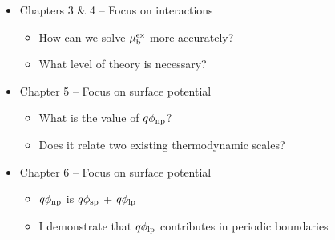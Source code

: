 \begin{intro}
   \begin{itemize}
       \item Chapters 3 \& 4 -- Focus on interactions
        \begin{itemize}
            \item How can we solve $\mu^{\mathrm{ex}}_{\mathrm{b}}$ more accurately? 
            \item What level of theory is necessary?
        \end{itemize}
       \item Chapter 5 -- Focus on surface potential
        \begin{itemize}
            \item What is the value of $q\phi_{\mathrm{np}}$? 
            \item Does it relate two existing thermodynamic scales?
        \end{itemize}
       \item Chapter 6 -- Focus on surface potential
        \begin{itemize}
            \item $q\phi_{\mathrm{np}}$ is $q\phi_{\mathrm{sp}}$ + $q\phi_{\mathrm{lp}}$
            \item I demonstrate that $q\phi_{\mathrm{lp}}$ contributes in periodic boundaries
        \end{itemize}
   \end{itemize}
   
\end{intro}
